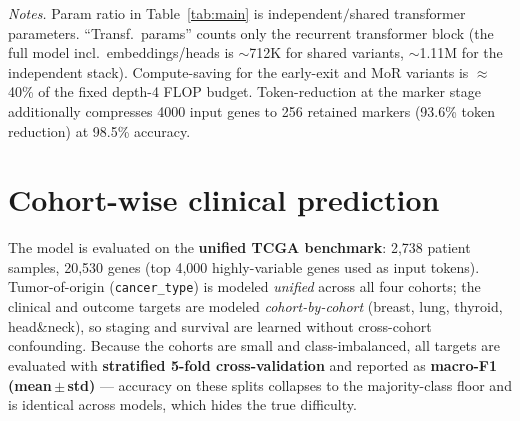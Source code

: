 \documentclass[11pt]{article}
\begin{document}
\vspace{0.5em}
\noindent\footnotesize
\textit{Notes.} Param ratio in Table~\ref{tab:main} is independent$/$shared transformer
parameters. ``Transf.\ params'' counts only the recurrent transformer block (the full model
incl.\ embeddings/heads is $\sim$712K for shared variants, $\sim$1.11M for the independent
stack). Compute-saving for the early-exit and MoR variants is $\approx$40\% of the fixed
depth-4 FLOP budget. Token-reduction at the marker stage additionally compresses 4000 input
genes to 256 retained markers (93.6\% token reduction) at 98.5\% accuracy.

\clearpage
\section*{Cohort-wise clinical prediction}
\normalsize
The model is evaluated on the \textbf{unified TCGA benchmark}: 2{,}738 patient samples,
20{,}530 genes (top 4{,}000 highly-variable genes used as input tokens). Tumor-of-origin
(\texttt{cancer\_type}) is modeled \emph{unified} across all four cohorts; the clinical and
outcome targets are modeled \emph{cohort-by-cohort} (breast, lung, thyroid, head\&neck), so
staging and survival are learned without cross-cohort confounding. Because the cohorts are
small and class-imbalanced, all targets are evaluated with \textbf{stratified 5-fold
cross-validation} and reported as \textbf{macro-F1 (mean\,$\pm$\,std)} --- accuracy on these
splits collapses to the majority-class floor and is identical across models, which hides the
true difficulty.
\end{document}
